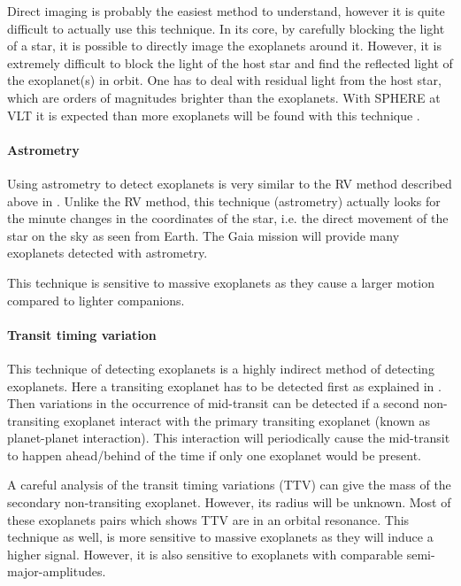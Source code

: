 Direct imaging is probably the easiest method to understand, however it is quite difficult to
actually use this technique. In its core, by carefully blocking the light of a star, it is possible
to directly image the exoplanets around it. However, it is extremely difficult to block the light of
the host star and find the reflected light of the exoplanet(s) in orbit. One has to deal with
residual light from the host star, which are orders of magnitudes brighter than the exoplanets. With
SPHERE at VLT it is expected than more exoplanets will be found with this technique
\citep{Beuzit2008}.


\paragraph{Astrometry}

Using astrometry to detect exoplanets is very similar to the RV method described above in
. Unlike the RV method, this technique (astrometry) actually looks for the minute
changes in the coordinates of the star, i.e. the direct movement of the star on the sky as seen from
Earth. The Gaia mission \citep{GAIA} will provide many exoplanets detected with astrometry.

This technique is sensitive to massive exoplanets as they cause a larger motion compared to lighter
companions.


\paragraph{Transit timing variation}

This technique of detecting exoplanets is a highly indirect method of detecting exoplanets. Here a
transiting exoplanet has to be detected first as explained in . Then
variations in the occurrence of mid-transit can be detected if a second non-transiting exoplanet
interact with the primary transiting exoplanet (known as planet-planet interaction). This
interaction will periodically cause the mid-transit to happen ahead/behind of the time if only one
exoplanet would be present.

A careful analysis of the transit timing variations (TTV) can give the mass of the secondary
non-transiting exoplanet. However, its radius will be unknown. Most of these exoplanets pairs which
shows TTV are in an orbital resonance. This technique as well, is more sensitive to massive
exoplanets as they will induce a higher signal. However, it is also sensitive to exoplanets with
comparable semi-major-amplitudes.


